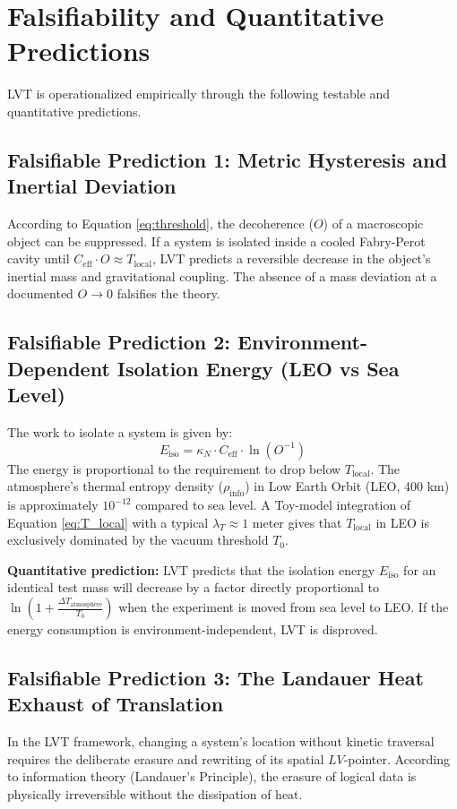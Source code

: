 \documentclass[12pt,a4paper]{article}
\begin{document}
\section{Falsifiability and Quantitative Predictions}

LVT is operationalized empirically through the following testable and quantitative predictions.

\subsection{Falsifiable Prediction 1: Metric Hysteresis and Inertial Deviation}
According to Equation \ref{eq:threshold}, the decoherence ($O$) of a macroscopic object can be suppressed. If a system is isolated inside a cooled Fabry-Perot cavity until $C_{\mathrm{eff}} \cdot O \approx T_{\mathrm{local}}$, LVT predicts a reversible decrease in the object's inertial mass and gravitational coupling. The absence of a mass deviation at a documented $O \to 0$ falsifies the theory.

\subsection{Falsifiable Prediction 2: Environment-Dependent Isolation Energy (LEO vs Sea Level)}
The work to isolate a system is given by:
\begin{equation}\label{eq:nilsson_work}
E_{\text{iso}} = \kappa_N \cdot C_{\mathrm{eff}} \cdot \ln(O^{-1})
\end{equation}
The energy is proportional to the requirement to drop below $T_{\mathrm{local}}$. The atmosphere's thermal entropy density ($\rho_{\mathrm{info}}$) in Low Earth Orbit (LEO, 400 km) is approximately $10^{-12}$ compared to sea level. A Toy-model integration of Equation \ref{eq:T_local} with a typical $\lambda_T \approx 1$ meter gives that $T_{\mathrm{local}}$ in LEO is exclusively dominated by the vacuum threshold $T_0$.

\textbf{Quantitative prediction:} LVT predicts that the isolation energy $E_{\text{iso}}$ for an identical test mass will decrease by a factor directly proportional to $\ln(1 + \frac{\Delta T_{\text{atmosphere}}}{T_0})$ when the experiment is moved from sea level to LEO. If the energy consumption is environment-independent, LVT is disproved.

\subsection{Falsifiable Prediction 3: The Landauer Heat Exhaust of Translation}
In the LVT framework, changing a system's location without kinetic traversal requires the deliberate erasure and rewriting of its spatial $LV$-pointer. According to information theory (Landauer's Principle), the erasure of logical data is physically irreversible without the dissipation of heat. 
\end{document}

